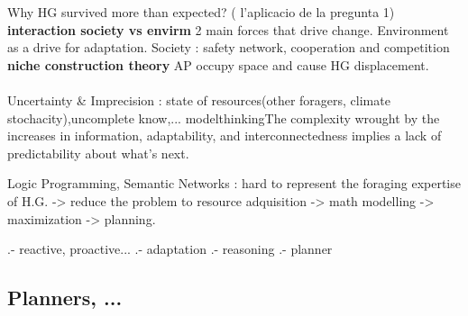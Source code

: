 \documentclass[11pt,oneside,a4paper,openright]{report}
\begin{document}
		  Why HG survived more than expected? ( l'aplicacio de la pregunta 1)
			\textbf{interaction society vs envirm}
				2 main forces that drive change.
				Environment as a drive for adaptation.
				Society : safety network, cooperation and competition
\\
			\textbf{niche construction theory}
				AP occupy space and cause HG displacement.
\\
\\







Uncertainty \& Imprecision : state of resources(other foragers, climate stochacity),uncomplete know,... 
modelthinking{The complexity wrought by the increases in information, adaptability, and interconnectedness implies a lack of predictability about what's next}.

Logic Programming, Semantic Networks : hard to represent the foraging expertise of H.G. -> reduce the problem to 
resource adquisition -> math modelling -> maximization -> planning.

	  .- reactive, proactive...
	  .- adaptation
	  .- reasoning
	  .- planner

\subsection{Planners, ...}
\end{document}

